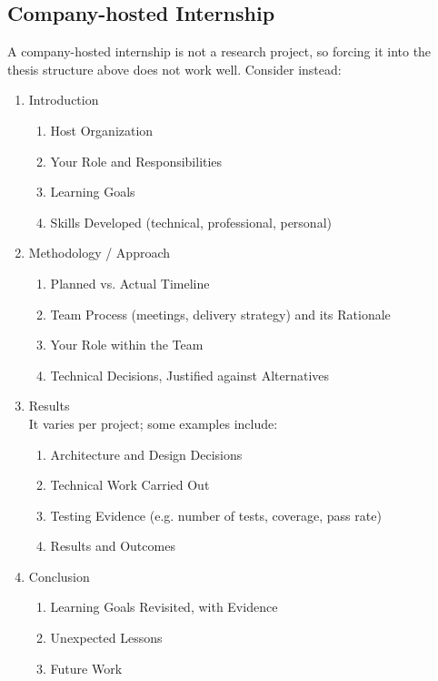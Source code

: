 \subsection{Company-hosted Internship}
\label{sec:c1:companyinternship}

A company-hosted internship is not a research project, so forcing it into the thesis structure above does not work well. Consider instead:

\begin{enumerate}
    \item Introduction
    \begin{enumerate}
        \item Host Organization
        \item Your Role and Responsibilities
        \item Learning Goals
        \item Skills Developed (technical, professional, personal)
    \end{enumerate}
    \item Methodology / Approach
    \begin{enumerate}
        \item Planned vs. Actual Timeline
        \item Team Process (meetings, delivery strategy) and its Rationale
        \item Your Role within the Team
        \item Technical Decisions, Justified against Alternatives
    \end{enumerate}
    \item Results\\
    It varies per project; some examples include:
    \begin{enumerate}
        \item Architecture and Design Decisions
        \item Technical Work Carried Out
        \item Testing Evidence (e.g. number of tests, coverage, pass rate)
        \item Results and Outcomes
    \end{enumerate}
    \item Conclusion
    \begin{enumerate}
        \item Learning Goals Revisited, with Evidence
        \item Unexpected Lessons
        \item Future Work
    \end{enumerate}
\end{enumerate}

